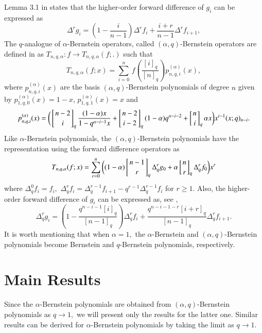 \documentclass[12pt]{article}
\numberwithin{equation}{section} \theoremstyle{plain}
\theoremstyle{definition}
\theoremstyle{remark}
\newcommand{\qbinom}[2]{\left[\genfrac{}{}{0pt}{}{#1}{#2}\right]_{q}}
\begin{document}
Lemma 3.1 in \cite{xia} states that the higher-order forward difference of $g_i$ can be expressed as 
\begin{equation*}
\Delta^rg_i=\left(1-\frac{i}{n-1}\right)\Delta^rf_i+\frac{i+r}{n-1}\Delta^rf_{i+1},
\end{equation*}
The $q$-analogue of $\alpha$-Bernstein operators, called $(\alpha,q)$-Bernstein operators are defined in \cite{qingbo} as 
$T_{n,q,\alpha}:f\rightarrow T_{n,q,\alpha}(f;.)$ such that
$$
T_{n,q,\alpha}(f;x)=\sum_{i=0}^n\,f\left(\frac{[i]_q}{[n]_q}\right)p_{n,q,i}^{(\alpha)}(x),
$$
where $p_{n,q,i}^{(\alpha)}(x)$ are the basis $(\alpha,q)$-Bernstein polynomials of degree $n$ given by 
$p_{1,q,0}^{(\alpha)}(x)=1-x$, $p_{1,q,1}^{(\alpha)}(x)= x$ and 
\begin{align*}
p_{n,q,i}^{(\alpha)}(x)=\bigg(\qbinom{n-2}{i}\frac{(1-\alpha)x}{1-q^{n-i-1}x}+\qbinom{n-2}{i-2}(1-\alpha)q^{n-i-2}
+\qbinom{n}{i}\alpha x\bigg)x^{i-1}(x;q)_{n-i}.
\end{align*}
Like $\alpha$-Bernstein polynomials, the $(\alpha,q)$-Bernstein polynomials have the representation using the forward difference operators as 
\begin{equation}\label{Tnqo}
T_{n,q,\alpha}(f;x)=\sum_{r=0}^n\bigg((1-\alpha)\qbinom{n-1}{r}\Delta_q^rg_0+\alpha\qbinom{n}{r}\Delta_q^rf_0\bigg)x^r
\end{equation}
where 
$\Delta_q^{0}f_i=f_i,$ $\Delta_q^{r}f_i=\Delta_q^{r-1}f_{i+1}-q^{r-1}\Delta_q^{r-1}f_i$ for $r\geq 1.$
Also, the higher-order forward difference of $g_i$ can be expressed as, see \cite[Lemma 2.4]{qingbo},
\begin{equation}\label{delqr}
\Delta^r_qg_i=\left(1-\frac{q^{n-i-1}[i]_q}{[n-1]_q}\right)\Delta^r_qf_i+\frac{q^{n-i-1-r}[i+r]_q}{[n-1]_q}\Delta^r_qf_{i+1}.
\end{equation}
It is worth mentioning that when $\alpha=1,$ the $\alpha$-Bernstein and $(\alpha, q)$-Bernstein polynomials become Bernstein and $q$-Bernstein polynomials, respectively.





\section{Main Results}
Since the $\alpha$-Bernstein polynomials are obtained from $(\alpha,q)$-Bernstein polynomials as $q\to 1,$ we will present only the results for the latter one. Similar results can be derived for $\alpha$-Bernstein polynomials by taking the limit as $q\to 1.$
\end{document}
